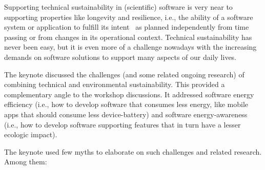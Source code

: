 \documentclass[11pt, oneside]{amsart}
\begin{document}
Supporting technical sustainability in (scientific) software is very near to supporting properties like longevity and resilience, i.e., the ability of a software system or application to fulfill its intent~\cite{Huisman2016} as planned independently from time passing or from changes in its operational context. Technical sustainability has never been easy, but it is even more of a challenge nowadays with the increasing demands on software solutions to support many aspects of our daily lives.

The keynote discussed the challenges (and some related ongoing research) of combining technical and environmental sustainability. This provided a complementary angle to the workshop discussions. It addressed software energy efficiency (i.e., how to develop software that consumes less energy, like mobile apps that should consume less device-battery) and software energy-awareness (i.e., how to develop software supporting features that in turn have a lesser ecologic impact).

The keynote used few myths to elaborate on such challenges and related research. Among them:
\end{document}
